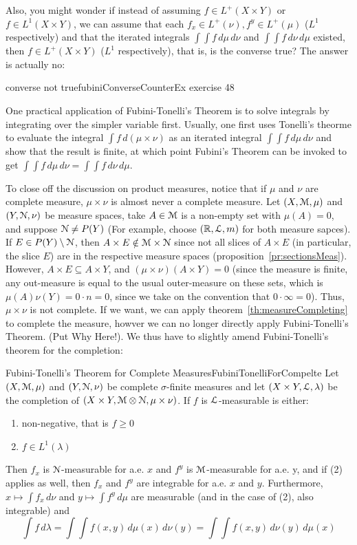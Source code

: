 \documentclass[oneside]{book}
\newcommand{\R}{\mathbb{R}}
\newcommand{\EM}{\EuScript{M}}
\newcommand{\EN}{\EuScript{N}}
\newcommand{\EL}{\EuScript{L}}
\newcommand{\sse}{\subseteq}
\begin{document}
Also, you might wonder if instead of assuming $f \in L^+(X\times Y)$ or $f\in L^1(X\times Y)$, we can assume that each
$f_x \in L^+(\nu), f^y \in L^+(\mu)$ ($L^1$ respectively) and that the iterated integrals $\int \int f\,d\mu\,d\nu$ and
$\int \int f\,d\nu\,d\mu$ existed, then $f \in L^+(X\times Y)$ ($L^1$ respectively), that is, is the converse true? The
answer is actually no:

\begin{example}{converse not true}{fubiniConverseCounterEx}
	exercise 48
\end{example}

One practical application of Fubini-Tonelli's Theorem is to solve integrals by integrating over the simpler variable
first. Usually, one first uses Tonelli's theorme to evaluate the integral $\int f\,d(\mu\times \nu)$ as an iterated
integral $\int\int f\,d\mu\,d\nu$ and show that the result is finite, at which point Fubini's Theorem can be invoked to
get $\int\int f\,d\mu\,d\nu =\int\int f\,d\nu\,d\mu$. 

To close off the discussion on product measures, notice that if $\mu$ and $\nu$ are complete measure, $\mu\times\nu$ is
almost never a complete measure. Let $(X, \EM, \mu)$ and $(Y, \EN, \nu)$ be measure spaces, take $A \in \EM$ is
a non-empty set with $\mu(A) = 0$, and suppose $\EN \ne P(Y)$ (For example, choose $(\R, \EL, m)$ for both measure
sapces). If $E \in P(Y)\setminus \EN$, then $A\times E \notin \EM\times \EN$ since not all slices of $A\times E$ (in
particular, the slice $E$) are in the respective measure spaces (proposition~\ref{pr:sectionsMeas}). However, $A\times
E \sse A\times Y$, and $(\mu\times\nu)(A\times Y) = 0$ (since the measure is finite, any out-measure is equal to the
usual outer-measure on these sets, which is $\mu(A)\nu(Y)  = 0\cdot n = 0$, since we take on the convention that $0\cdot
\infty = 0$). Thus, $\mu\times \nu$ is not complete. If we want, we can apply theorem~\ref{th:measureCompleting} to
complete the measure, howver we can no longer directly apply Fubini-Tonelli's Theorem. (Put Why Here!). We thus have to
slightly amend Fubini-Tonelli's theorem for the completion:

\begin{thm}{Fubini-Tonelli's Theorem for Complete Measures}{FubiniTonelliForCompelte}
	Let $(X, \EM, \mu)$ and $(Y, \EN, \nu)$ be complete $\sigma$-finite measures and let $(X\times Y, \EL, \lambda)$ be
	the completion of $(X\times Y, \EM\otimes \EN, \mu\times \nu)$. If $f$ is $\EL$-measurable is either:
	\begin{enumerate}
		\item non-negative, that is $f \ge 0$
		\item $f \in L^1(\lambda)$
	\end{enumerate}
	Then $f_x$ is $\EN$-measurable for a.e. $x$ and $f^y$ is $\EM$-measurable for a.e. y, and if (2) applies as well,
	then $f_x$ and $f^y$ are integrable for a.e. $x$ and $y$. Furthermore, $x \mapsto \int f_x\,d\nu$ and $y \mapsto
	\int f^y\,d\mu$ are measurable (and in the case of (2), also integrable) and
	\[
		\int f\,d\lambda = \int\int f(x,y)\,d\mu(x)\,d\nu(y) = \int\int f(x,y)\,d\nu(y)\,d\mu(x)
	\]
\end{thm}
\end{document}
